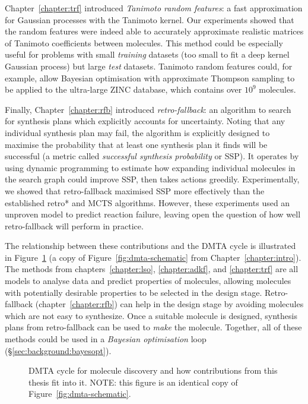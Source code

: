 Chapter~\ref{chapter:trf} introduced \emph{Tanimoto random features}:
a fast approximation for Gaussian processes with the Tanimoto kernel.
Our experiments showed that the random features were indeed able to accurately
approximate realistic matrices of Tanimoto coefficients between molecules.
This method could be especially useful for problems with small \emph{training} datasets
(too small to fit a deep kernel Gaussian process)
but large \emph{test} datasets.
Tanimoto random features could, for example,
allow Bayesian optimisation with approximate Thompson sampling to be applied
to the ultra-large ZINC database,
which contains over $10^9$ molecules.

Finally, Chapter~\ref{chapter:rfb} introduced \emph{retro-fallback}:
an algorithm to search for synthesis plans which explicitly accounts for uncertainty.
Noting that any individual synthesis plan may fail,
the algorithm is explicitly designed to maximise the probability
that at least one synthesis plan it finds will be successful
(a metric called \emph{successful synthesis probability} or SSP).
It operates by using dynamic programming to estimate how expanding
individual molecules in the search graph could improve SSP,
then takes actions greedily.
Experimentally, we showed that retro-fallback
maximised SSP more effectively than the established retro* and MCTS algorithms.
However, these experiments used an unproven model to predict reaction failure,
leaving open the question of how well retro-fallback will perform in practice.

The relationship between these contributions and the DMTA cycle
is illustrated in Figure~\ref{fig:dmta-schematic-conclusion}
(a copy of Figure~\ref{fig:dmta-schematic} from Chapter~\ref{chapter:intro}).
The methods from
chapters~\ref{chapter:lso}, \ref{chapter:adkf}, and \ref{chapter:trf}
are all models to analyse data and predict properties of molecules,
allowing molecules with potentially desirable properties to be selected
in the design stage.
Retro-fallback (chapter~\ref{chapter:rfb}) can help in the design stage
by avoiding molecules which are not easy to synthesize.
Once a suitable molecule is designed, synthesis plans
from retro-fallback can be used to \emph{make} the molecule.
Together, all of these methods could be used in a \emph{Bayesian optimisation} loop
(\S\ref{sec:background:bayesopt}).

\begin{figure}[htb]
    
    \caption[Repeated schematic of the DMTA cycle]{
        DMTA cycle for molecule discovery
        and how contributions from this thesis fit into it.
        NOTE: this figure is an identical copy of Figure~\ref{fig:dmta-schematic}.
    } 
    \label{fig:dmta-schematic-conclusion}
\end{figure}



